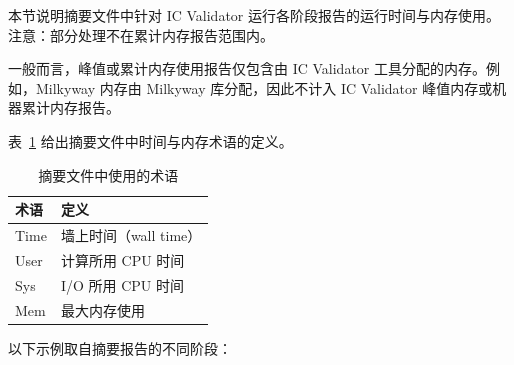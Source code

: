 本节说明摘要文件中针对 IC Validator 运行各阶段报告的运行时间与内存使用。注意：部分处理不在累计内存报告范围内。

\begin{noteBox}
一般而言，峰值或累计内存使用报告仅包含由 IC Validator 工具分配的内存。例如，Milkyway 内存由 Milkyway 库分配，因此不计入 IC Validator 峰值内存或机器累计内存报告。
\end{noteBox}

表~\ref{tab:icv-sum-terms} 给出摘要文件中时间与内存术语的定义。

\begin{table}[htbp]
\centering
\caption{摘要文件中使用的术语}
\label{tab:icv-sum-terms}
\begin{tabular}{@{}lp{}@{}}
\toprule
\textbf{术语} & \textbf{定义} \\
\midrule
Time & 墙上时间（wall time） \\
User & 计算所用 CPU 时间 \\
Sys  & I/O 所用 CPU 时间 \\
Mem  & 最大内存使用 \\
\bottomrule
\end{tabular}
\end{table}

以下示例取自摘要报告的不同阶段：

